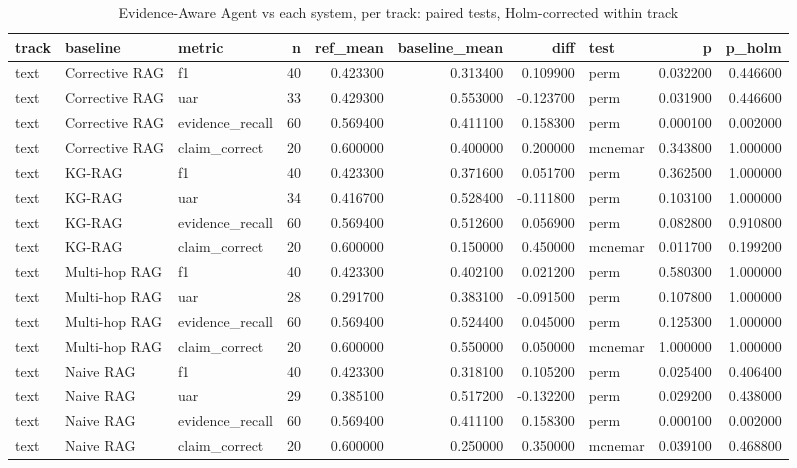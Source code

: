\begin{table}
\caption{Evidence-Aware Agent vs each system, per track: paired tests, Holm-corrected within track}
\label{tab:table_significance}
\begin{tabular}{lllrrrrlrr}
\toprule
track & baseline & metric & n & ref\_mean & baseline\_mean & diff & test & p & p\_holm \\
\midrule
text & Corrective RAG & f1 & 40 & 0.423300 & 0.313400 & 0.109900 & perm & 0.032200 & 0.446600 \\
text & Corrective RAG & uar & 33 & 0.429300 & 0.553000 & -0.123700 & perm & 0.031900 & 0.446600 \\
text & Corrective RAG & evidence\_recall & 60 & 0.569400 & 0.411100 & 0.158300 & perm & 0.000100 & 0.002000 \\
text & Corrective RAG & claim\_correct & 20 & 0.600000 & 0.400000 & 0.200000 & mcnemar & 0.343800 & 1.000000 \\
text & KG-RAG & f1 & 40 & 0.423300 & 0.371600 & 0.051700 & perm & 0.362500 & 1.000000 \\
text & KG-RAG & uar & 34 & 0.416700 & 0.528400 & -0.111800 & perm & 0.103100 & 1.000000 \\
text & KG-RAG & evidence\_recall & 60 & 0.569400 & 0.512600 & 0.056900 & perm & 0.082800 & 0.910800 \\
text & KG-RAG & claim\_correct & 20 & 0.600000 & 0.150000 & 0.450000 & mcnemar & 0.011700 & 0.199200 \\
text & Multi-hop RAG & f1 & 40 & 0.423300 & 0.402100 & 0.021200 & perm & 0.580300 & 1.000000 \\
text & Multi-hop RAG & uar & 28 & 0.291700 & 0.383100 & -0.091500 & perm & 0.107800 & 1.000000 \\
text & Multi-hop RAG & evidence\_recall & 60 & 0.569400 & 0.524400 & 0.045000 & perm & 0.125300 & 1.000000 \\
text & Multi-hop RAG & claim\_correct & 20 & 0.600000 & 0.550000 & 0.050000 & mcnemar & 1.000000 & 1.000000 \\
text & Naive RAG & f1 & 40 & 0.423300 & 0.318100 & 0.105200 & perm & 0.025400 & 0.406400 \\
text & Naive RAG & uar & 29 & 0.385100 & 0.517200 & -0.132200 & perm & 0.029200 & 0.438000 \\
text & Naive RAG & evidence\_recall & 60 & 0.569400 & 0.411100 & 0.158300 & perm & 0.000100 & 0.002000 \\
text & Naive RAG & claim\_correct & 20 & 0.600000 & 0.250000 & 0.350000 & mcnemar & 0.039100 & 0.468800 \\

\end{tabular}
\end{table}
